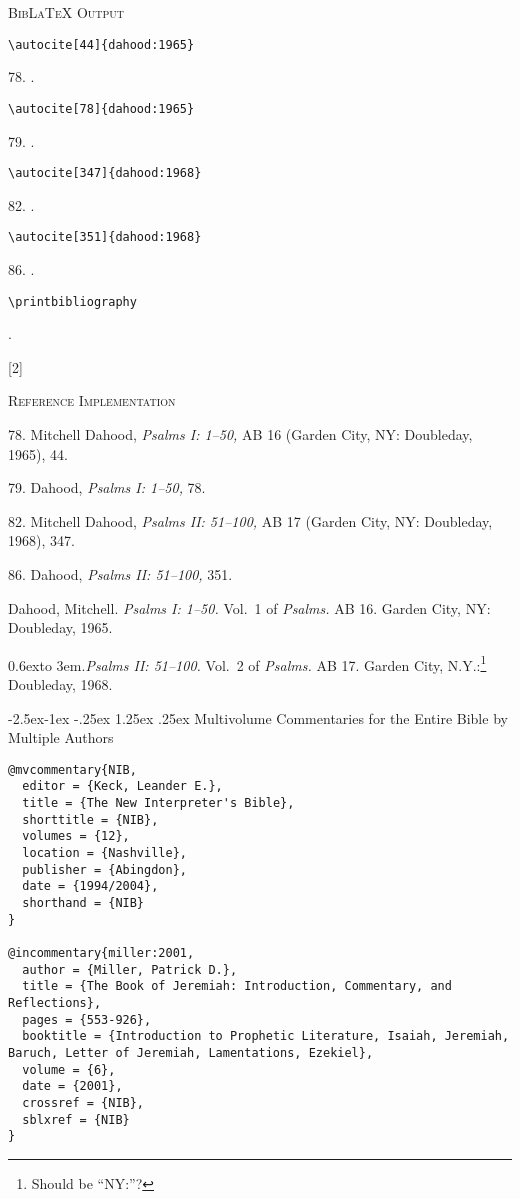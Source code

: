 \documentclass[a4paper]{article}
\makeatletter
\renewcommand*{\bibnamedash}{%
  \leavevmode\raise 0.6ex\hbox to 3em{\hrulefill}.\space}
\renewcommand\paragraph{\@startsection{paragraph}{4}{\z@}%
            {-2.5ex\@plus -1ex \@minus -.25ex}%
            {1.25ex \@plus .25ex}%
            {\normalfont\normalsize\bfseries}}
\newenvironment{refimp}{%
  \begin{minipage}{\linewidth}
    \setlength{\parskip}{1ex}
    \textsc{Reference Implementation}\par
    \nobreak
    \color{reference-colour}
}{\end{minipage}}
\makeatother
\begin{document}
{\textsc{BibLaTeX Output}\par
   \nobreak
   \texttt{\textbackslash autocite[44]\{dahood:1965\}}\par
   \color{biblatex-colour}
   78. \cite[44]{dahood:1965}.\par
   \color{black}
   \texttt{\textbackslash autocite[78]\{dahood:1965\}}\par
   \color{biblatex-colour}
   79. \cite[78]{dahood:1965}.\par
   \color{black}
   \texttt{\textbackslash autocite[347]\{dahood:1968\}}\par
   \color{biblatex-colour}
   82. \cite[347]{dahood:1968}.\par
   \color{black}
   \texttt{\textbackslash autocite[351]\{dahood:1968\}}\par
   \color{biblatex-colour}
   86. \cite[351]{dahood:1968}.\par
   \color{black}
   \texttt{\textbackslash printbibliography}\par
   \color{biblatex-colour}
   \hangindent\bibindent{}.\par
   [2]{%
     }
   \hangindent\bibindent{}\par}

\begin{refimp}
  78. Mitchell Dahood, \emph{Psalms I: 1–50,} AB 16 (Garden City, NY:
  Doubleday, 1965), 44.

  79. Dahood, \emph{Psalms I: 1–50,} 78.

  82. Mitchell Dahood, \emph{Psalms II: 51–100,} AB 17 (Garden City, NY:
  Doubleday, 1968), 347.

  86. Dahood, \emph{Psalms II: 51–100,} 351.

  \hangindent\bibindent Dahood, Mitchell. \emph{Psalms I: 1–50.} Vol.~1 of
  \emph{Psalms.} AB 16. Garden City, NY: Doubleday, 1965.

  \hangindent\bibindent\bibnamedash \emph{Psalms II: 51–100.} Vol.~2 of
  \emph{Psalms.} AB 17. Garden City, N.Y.:\footnote{Should be “NY:”?}
  Doubleday, 1968.
\end{refimp}

\paragraph{Multivolume Commentaries for the Entire Bible by Multiple Authors}

\begin{lstlisting}
@mvcommentary{NIB,
  editor = {Keck, Leander E.},
  title = {The New Interpreter's Bible},
  shorttitle = {NIB},
  volumes = {12},
  location = {Nashville},
  publisher = {Abingdon},
  date = {1994/2004},
  shorthand = {NIB}
}

@incommentary{miller:2001,
  author = {Miller, Patrick D.},
  title = {The Book of Jeremiah: Introduction, Commentary, and Reflections},
  pages = {553-926},
  booktitle = {Introduction to Prophetic Literature, Isaiah, Jeremiah, Baruch, Letter of Jeremiah, Lamentations, Ezekiel},
  volume = {6},
  date = {2001},
  crossref = {NIB},
  sblxref = {NIB}
}
\end{lstlisting}
\end{document}
